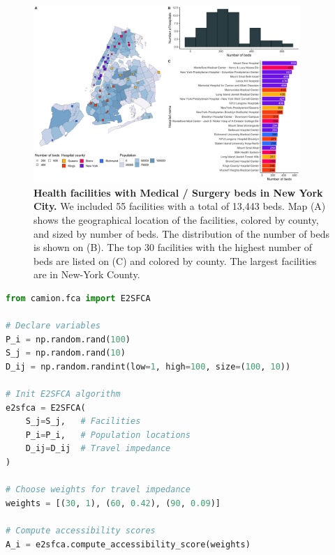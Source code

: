 \begin{figure}[H]
    \includegraphics[width=0.9\textwidth]{images/camion-ny/fig1.png}
    \centering
    \caption{
        \textbf{Health facilities with Medical / Surgery beds in New York City.} We included 55 facilities with a total of 13,443 beds. Map (A) shows the geographical location of the facilities, colored by county, and sized by number of beds. The distribution of the number of beds is shown on (B). The top 30 facilities with the highest number of beds are listed on (C) and colored by county. The largest facilities are in New-York County.
    }
    \label{fig:camion-ny-beds}
\end{figure}

\begin{minipage}{\textwidth}
\begin{lstlisting}[language=Python, caption=Compute accessibility score with \ac{e2sfca}]
from camion.fca import E2SFCA

# Declare variables
P_i = np.random.rand(100)
S_j = np.random.rand(10)
D_ij = np.random.randint(low=1, high=100, size=(100, 10))

# Init E2SFCA algorithm
e2sfca = E2SFCA(
    S_j=S_j,   # Facilities
    P_i=P_i,   # Population locations
    D_ij=D_ij  # Travel impedance
)

# Choose weights for travel impedance
weights = [(30, 1), (60, 0.42), (90, 0.09)]

# Compute accessibility scores
A_i = e2sfca.compute_accessibility_score(weights)
\end{lstlisting}
\end{minipage}


